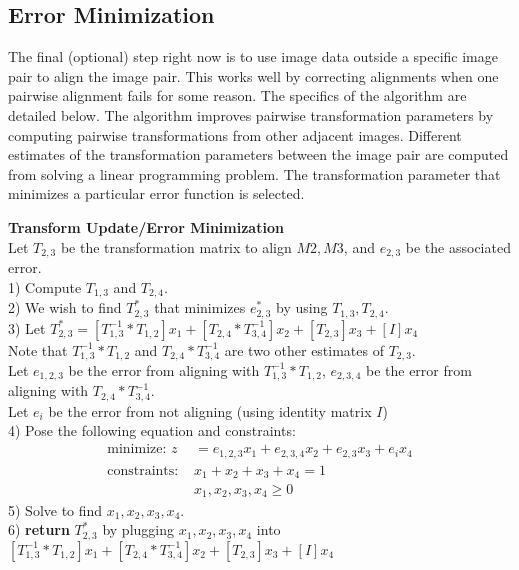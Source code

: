 \documentclass{article}
\begin{document}
\subsection{Error Minimization}
The final (optional) step right now is to use image data outside a specific image pair to align the image pair. This works well by correcting alignments when one pairwise alignment fails for some reason. The specifics of the algorithm are detailed below. The algorithm improves pairwise transformation parameters by computing pairwise transformations from other adjacent images. Different estimates of the transformation parameters between the image pair are computed from solving a linear programming problem. The transformation parameter that minimizes a particular error function is selected. \\

	\begin{algorithm}
	\DontPrintSemicolon
	\textbf{Transform Update/Error Minimization}\\
	Let $T_{2,3}$ be the transformation matrix to align $M2, M3$, and $e_{2,3}$ be the associated error.\\
	1) Compute $T_{1,3}$ and $T_{2,4}$.\\
	2) We wish to find $T_{2,3}^{*}$ that minimizes $e_{2,3}^{*}$ by using $T_{1,3},T_{2,4}$.\\
	3) Let $T_{2,3}^{*} = [T_{1,3}^{-1}*T_{1,2}]x_1 + [T_{2,4}*T_{3,4}^{-1}]x_2 + [T_{2,3}]x_3 + [I]x_4$\\
	Note that $T_{1,3}^{-1}*T_{1,2}$ and $T_{2,4}*T_{3,4}^{-1}$ are two other estimates of $T_{2,3}$.\\
	Let $e_{1,2,3}$ be the error from aligning with $T_{1,3}^{-1}*T_{1,2}$, $e_{2,3,4}$ be the error from aligning with $T_{2,4}*T_{3,4}^{-1}$.\\
	Let $e_i$ be the error from not aligning (using identity matrix $I$) \\
 	4) Pose the following equation and constraints:
	\begin{align*}
	 \text{minimize: } z &= e_{1,2,3}x_1 +  e_{2,3,4}x_2 + e_{2,3}x_3 + e_ix_4\\
	 \text{constraints: }&x_1 + x_2 + x_3 + x_4 = 1\\
	 &x_1, x_2, x_3, x_4 \ge 0
	\end{align*}
	5) Solve to find $x_1, x_2, x_3, x_4$.\\
	6) \textbf{return} $T_{2,3}^{*}$ by plugging $x_1, x_2, x_3, x_4$ into $[T_{1,3}^{-1}*T_{1,2}]x_1 + [T_{2,4}*T_{3,4}^{-1}]x_2 + [T_{2,3}]x_3 + [I]x_4$
	\end{algorithm}	
\end{document}
